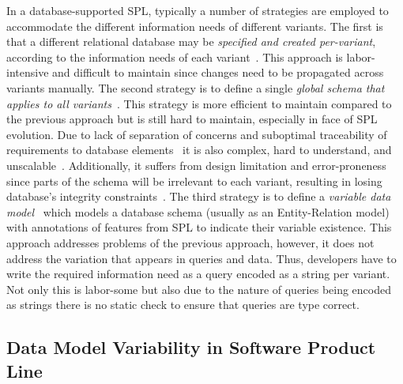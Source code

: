 In a database-supported SPL, 
typically a number of strategies are employed to
accommodate the different information needs of different variants.
%
The first is that a different relational database may be \emph{specified and
created per-variant}, according to the information needs of each
variant~\cite{marco13featureAdaptSch}. 
This approach is labor-intensive and difficult to maintain
since changes need to be propagated across variants manually.
%
The second strategy is to define a single \emph{global schema that applies
to all variants}~\cite{batini86dbSchIntegAnalysis}. 
This strategy is more efficient to maintain compared to the previous approach
but is still hard to maintain,
especially in face of SPL evolution. Due to lack of separation of concerns
and suboptimal traceability of requirements to database elements~\cite{skrhas09DBIS}
it is also complex, hard to understand, and unscalable~\cite{slrs12CAiSE}. 
Additionally, it suffers from design limitation and 
error-proneness since parts of the schema will be irrelevant to each variant,
resulting in losing database's integrity constraints~\cite{slrs12CAiSE}.
%
The third strategy is to define a \emph{variable data model}~\cite{skrhas09DBIS, 
slrs12CAiSE, ad11varDataModel} which models a database schema 
(usually as an Entity-Relation model) with
annotations of features from SPL to indicate their variable existence. 
This approach addresses problems of the previous approach, however,
it does not address the variation that appears in queries and data. 
Thus, developers have to write the required information need as a
query encoded as a string per variant. Not only this is labor-some but
also due to the nature of queries being encoded as strings there is no
static check to ensure that queries are type correct. 



\subsection{Data Model Variability in Software Product Line}
\label{sec:spl}



